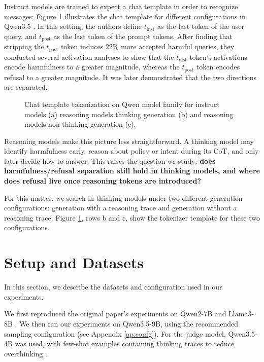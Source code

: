 \documentclass[nohyperref]{article}
\theoremstyle{plain}
\theoremstyle{definition}
\theoremstyle{remark}
\begin{document}
Instruct models are trained to expect a chat template in order to recognize messages; Figure \ref{fig:tokens} illustrates the chat template for different configurations in Qwen3.5 \citep{qwen3.5}. In this setting, the authors define $t_{\text{inst}}$ as the last token of the user query, and $t_{\text{post}}$ as the last token of the prompt tokens. After finding that stripping the $t_{\text{post}}$ token induces 22\% more accepted harmful queries, they conducted several activation analyses to show that the $t_{\text{inst}}$ token's activations encode harmfulness to a greater magnitude, whereas the $t_{\text{post}}$ token encodes refusal to a greater magnitude. It was later demonstrated that the two directions are separated.

\begin{figure}[h]
\centering
\resizebox{\textwidth}{!}{%

}
\caption{Chat template tokenization on Qwen model family for instruct models (a) reasoning models thinking generation (b) and reasoning models non-thinking generation (c).}
\label{fig:tokens}
\end{figure}

Reasoning models make this picture less straightforward. A thinking model may identify harmfulness early, reason about policy or intent during its CoT, and only later decide how to answer. This raises the question we study: \textbf{does harmfulness/refusal separation still hold in thinking models, and where does refusal live once reasoning tokens are introduced?} 

For this matter, we search in thinking models under two different generation configurations: generation with a reasoning trace and generation without a reasoning trace. Figure \ref{fig:tokens}, rows b and c, show the tokenizer template for these two configurations.

\section{Setup and Datasets}
\label{sec:datasets}

In this section, we describe the datasets and configuration used in our experiments.

We first reproduced the original paper's experiments on Qwen2-7B \citep{qwen2} and Llama3-8B \citep{llama3}. We then ran our experiments on Qwen3.5-9B, using the recommended sampling configuration (see Appendix \ref{ap:confg}). For the judge model, Qwen3.5-4B was used, with few-shot examples containing thinking traces to reduce overthinking \citep{ge2025innatereasoningenoughincontext}.
\end{document}
